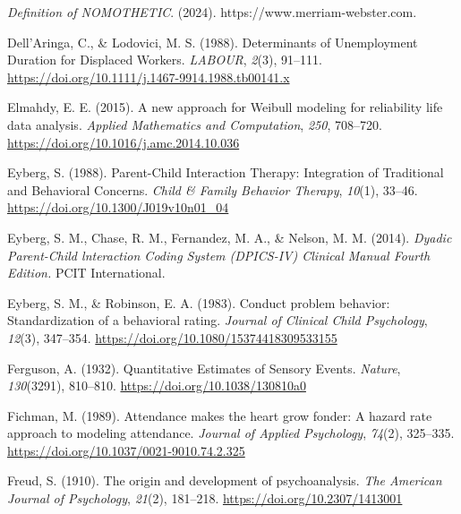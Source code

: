 \documentclass[12pt]{./styles/outhesis}
\begin{document}
\leavevmode{}%
\emph{Definition of {NOMOTHETIC}}. (2024).
https://www.merriam-webster.com.

\leavevmode{}%
Dell'Aringa, C., \& Lodovici, M. S. (1988). Determinants of
{Unemployment Duration} for {Displaced Workers}. \emph{LABOUR},
\emph{2}(3), 91--111.
\url{https://doi.org/10.1111/j.1467-9914.1988.tb00141.x}

\leavevmode{}%
Elmahdy, E. E. (2015). A new approach for {Weibull} modeling for
reliability life data analysis. \emph{Applied Mathematics and
Computation}, \emph{250}, 708--720.
\url{https://doi.org/10.1016/j.amc.2014.10.036}

\leavevmode{}%
Eyberg, S. (1988). Parent-{Child Interaction Therapy}: {Integration} of
{Traditional} and {Behavioral Concerns}. \emph{Child \& Family Behavior
Therapy}, \emph{10}(1), 33--46.
\url{https://doi.org/10.1300/J019v10n01_04}

\leavevmode{}%
Eyberg, S. M., Chase, R. M., Fernandez, M. A., \& Nelson, M. M. (2014).
\emph{Dyadic {Parent-Child} lnteraction {Coding System} ({DPICS-IV})
{Clinical Manual Fourth Edition}.} PCIT International.

\leavevmode{}%
Eyberg, S. M., \& Robinson, E. A. (1983). Conduct problem behavior:
{Standardization} of a behavioral rating. \emph{Journal of Clinical
Child Psychology}, \emph{12}(3), 347--354.
\url{https://doi.org/10.1080/15374418309533155}

\leavevmode{}%
Ferguson, A. (1932). Quantitative {Estimates} of {Sensory Events}.
\emph{Nature}, \emph{130}(3291), 810--810.
\url{https://doi.org/10.1038/130810a0}

\leavevmode{}%
Fichman, M. (1989). Attendance makes the heart grow fonder: {A} hazard
rate approach to modeling attendance. \emph{Journal of Applied
Psychology}, \emph{74}(2), 325--335.
\url{https://doi.org/10.1037/0021-9010.74.2.325}

\leavevmode{}%
Freud, S. (1910). The origin and development of psychoanalysis.
\emph{The American Journal of Psychology}, \emph{21}(2), 181--218.
\url{https://doi.org/10.2307/1413001}
\end{document}
